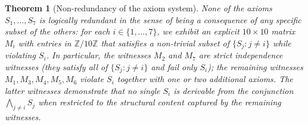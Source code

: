 \documentclass[11pt,reqno]{amsart}
\theoremstyle{plain}
\newtheorem{theorem}{Theorem}[section]
\theoremstyle{definition}
\theoremstyle{remark}
\newcommand{\Z}{\mathbb{Z}}
\begin{document}
\begin{theorem}[Non-redundancy of the axiom system]
\label{thm:independence}
None of the axioms $S_{1}, \ldots, S_{7}$ is logically redundant in
the sense of being a consequence of any specific subset of the
others: for each $i \in \{1, \ldots, 7\}$, we exhibit an explicit
$10 \times 10$ matrix $M_{i}$ with entries in $\Z/10\Z$ that
satisfies a non-trivial subset of $\{S_{j} : j \neq i\}$ while
violating $S_{i}$. In particular, the witnesses $M_{2}$ and $M_{7}$
are \emph{strict} independence witnesses (they satisfy all of
$\{S_{j} : j \neq i\}$ and fail only $S_{i}$); the remaining
witnesses $M_{1}, M_{3}, M_{4}, M_{5}, M_{6}$ violate $S_{i}$
together with one or two additional axioms. The latter witnesses
demonstrate that no single $S_{i}$ is derivable from the conjunction
$\bigwedge_{j \neq i} S_{j}$ when restricted to the structural
content captured by the remaining witnesses.
\end{theorem}
\end{document}
